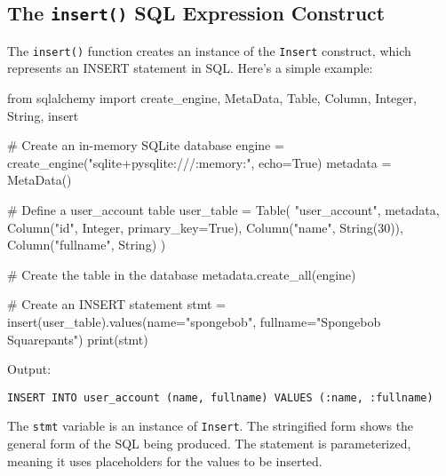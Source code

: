 \documentclass[
  letterpaper,
  DIV=11,
  numbers=noendperiod]{scrreprt}
\newenvironment{Shaded}{\begin{snugshade}}{\end{snugshade}}
\newcommand{\BuiltInTok}[1]{\textcolor[rgb]{0.00,0.23,0.31}{#1}}
\newcommand{\CommentTok}[1]{\textcolor[rgb]{0.37,0.37,0.37}{#1}}
\newcommand{\DecValTok}[1]{\textcolor[rgb]{0.68,0.00,0.00}{#1}}
\newcommand{\ImportTok}[1]{\textcolor[rgb]{0.00,0.46,0.62}{#1}}
\newcommand{\NormalTok}[1]{\textcolor[rgb]{0.00,0.23,0.31}{#1}}
\newcommand{\OperatorTok}[1]{\textcolor[rgb]{0.37,0.37,0.37}{#1}}
\newcommand{\StringTok}[1]{\textcolor[rgb]{0.13,0.47,0.30}{#1}}
\newcommand{\VariableTok}[1]{\textcolor[rgb]{0.07,0.07,0.07}{#1}}
\begin{document}
\subsection{\texorpdfstring{The \texttt{insert()} SQL Expression
Construct}{The insert() SQL Expression Construct}}\label{the-insert-sql-expression-construct}

The \texttt{insert()} function creates an instance of the
\texttt{Insert} construct, which represents an INSERT statement in SQL.
Here's a simple example:

\begin{Shaded}
\begin{Highlighting}[]
\ImportTok{from}\NormalTok{ sqlalchemy }\ImportTok{import}\NormalTok{ create\_engine, MetaData, Table, Column, Integer, String, insert}

\CommentTok{\# Create an in{-}memory SQLite database}
\NormalTok{engine }\OperatorTok{=}\NormalTok{ create\_engine(}\StringTok{"sqlite+pysqlite:///:memory:"}\NormalTok{, echo}\OperatorTok{=}\VariableTok{True}\NormalTok{)}
\NormalTok{metadata }\OperatorTok{=}\NormalTok{ MetaData()}

\CommentTok{\# Define a user\_account table}
\NormalTok{user\_table }\OperatorTok{=}\NormalTok{ Table(}
    \StringTok{"user\_account"}\NormalTok{, metadata,}
\NormalTok{    Column(}\StringTok{"id"}\NormalTok{, Integer, primary\_key}\OperatorTok{=}\VariableTok{True}\NormalTok{),}
\NormalTok{    Column(}\StringTok{"name"}\NormalTok{, String(}\DecValTok{30}\NormalTok{)),}
\NormalTok{    Column(}\StringTok{"fullname"}\NormalTok{, String)}
\NormalTok{)}

\CommentTok{\# Create the table in the database}
\NormalTok{metadata.create\_all(engine)}

\CommentTok{\# Create an INSERT statement}
\NormalTok{stmt }\OperatorTok{=}\NormalTok{ insert(user\_table).values(name}\OperatorTok{=}\StringTok{"spongebob"}\NormalTok{, fullname}\OperatorTok{=}\StringTok{"Spongebob Squarepants"}\NormalTok{)}
\BuiltInTok{print}\NormalTok{(stmt)}
\end{Highlighting}
\end{Shaded}

Output:

\begin{verbatim}
INSERT INTO user_account (name, fullname) VALUES (:name, :fullname)
\end{verbatim}

The \texttt{stmt} variable is an instance of \texttt{Insert}. The
stringified form shows the general form of the SQL being produced. The
statement is parameterized, meaning it uses placeholders for the values
to be inserted.
\end{document}
